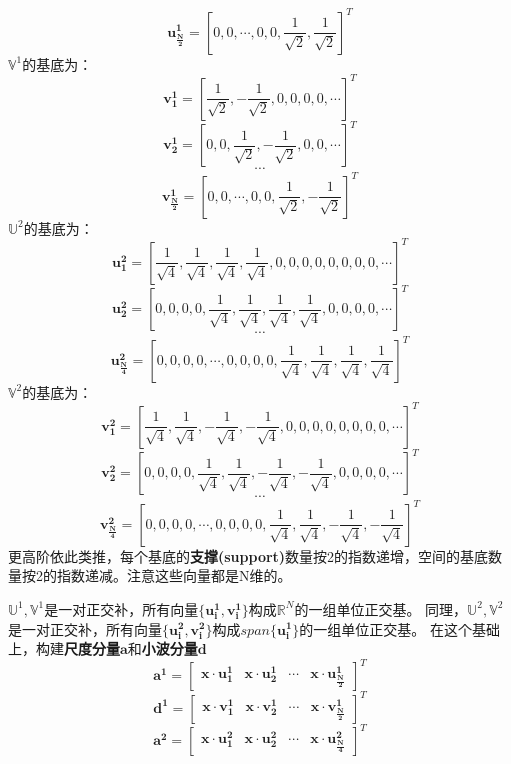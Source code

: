 \documentclass{article}
\begin{document}
\begin{CJK}{UTF8}{gbsn}
	$$\boldsymbol{u^1_{\frac{N}{2}}}=[0,0,\cdots,0,0,\frac{1}{\sqrt{2}},\frac{1}{\sqrt{2}}]^T$$
	$\mathbb{V}^1$的基底为：
	$$\boldsymbol{v^1_1}=[\frac{1}{\sqrt{2}},-\frac{1}{\sqrt{2}},0,0,0,0,\cdots]^T$$
    $$\boldsymbol{v^1_2}=[0,0,\frac{1}{\sqrt{2}},-\frac{1}{\sqrt{2}},0,0,\cdots]^T$$
    $$\cdots$$
    $$\boldsymbol{v^1_{\frac{N}{2}}}=[0,0,\cdots,0,0,\frac{1}{\sqrt{2}},-\frac{1}{\sqrt{2}}]^T$$
	$\mathbb{U}^2$的基底为：
    $$\boldsymbol{u^2_1}=[\frac{1}{\sqrt{4}},\frac{1}{\sqrt{4}},\frac{1}{\sqrt{4}},\frac{1}{\sqrt{4}},0,0,0,0,0,0,0,0,\cdots]^T$$
    $$\boldsymbol{u^2_2}=[0,0,0,0,\frac{1}{\sqrt{4}},\frac{1}{\sqrt{4}},\frac{1}{\sqrt{4}},\frac{1}{\sqrt{4}},0,0,0,0,\cdots]^T$$
    $$\cdots$$
    $$\boldsymbol{u^2_{\frac{N}{4}}}=[0,0,0,0,\cdots,0,0,0,0,\frac{1}{\sqrt{4}},\frac{1}{\sqrt{4}},\frac{1}{\sqrt{4}},\frac{1}{\sqrt{4}}]^T$$
	$\mathbb{V}^2$的基底为：
    $$\boldsymbol{v^2_1}=[\frac{1}{\sqrt{4}},\frac{1}{\sqrt{4}},-\frac{1}{\sqrt{4}},-\frac{1}{\sqrt{4}},0,0,0,0,0,0,0,0,\cdots]^T$$
    $$\boldsymbol{v^2_2}=[0,0,0,0,\frac{1}{\sqrt{4}},\frac{1}{\sqrt{4}},-\frac{1}{\sqrt{4}},-\frac{1}{\sqrt{4}},0,0,0,0,\cdots]^T$$
    $$\cdots$$
    $$\boldsymbol{v^2_{\frac{N}{4}}}=[0,0,0,0,\cdots,0,0,0,0,\frac{1}{\sqrt{4}},\frac{1}{\sqrt{4}},-\frac{1}{\sqrt{4}},-\frac{1}{\sqrt{4}}]^T$$
	更高阶依此类推，每个基底的\textbf{支撑(support)}数量按2的指数递增，空间的基底数量按2的指数递减。注意这些向量都是N维的。\par
	$\mathbb{U}^1,\mathbb{V}^1$是一对正交补，所有向量$\{\boldsymbol{u^1_i},\boldsymbol{v^1_i}\}$构成$\mathbb{R}^N$的一组单位正交基。
	同理，$\mathbb{U}^2,\mathbb{V}^2$是一对正交补，所有向量$\{\boldsymbol{u^2_i},\boldsymbol{v^2_i}\}$构成$span\{\boldsymbol{u^1_i}\}$的一组单位正交基。
	在这个基础上，构建\textbf{尺度分量}$\boldsymbol{a}$和\textbf{小波分量}$\boldsymbol{d}$
	$$\boldsymbol{a^1}=\begin{bmatrix}\boldsymbol{x}\cdot\boldsymbol{u^1_1}&\boldsymbol{x}\cdot\boldsymbol{u^1_2}&\cdots&\boldsymbol{x}\cdot\boldsymbol{u^1_{\frac{N}{2}}}\end{bmatrix}^T$$
	$$\boldsymbol{d^1}=\begin{bmatrix}\boldsymbol{x}\cdot\boldsymbol{v^1_1}&\boldsymbol{x}\cdot\boldsymbol{v^1_2}&\cdots&\boldsymbol{x}\cdot\boldsymbol{v^1_{\frac{N}{2}}}\end{bmatrix}^T$$
	$$\boldsymbol{a^2}=\begin{bmatrix}\boldsymbol{x}\cdot\boldsymbol{u^2_1}&\boldsymbol{x}\cdot\boldsymbol{u^2_2}&\cdots&\boldsymbol{x}\cdot\boldsymbol{u^2_{\frac{N}{4}}}\end{bmatrix}^T$$

\end{CJK}
\end{document}
